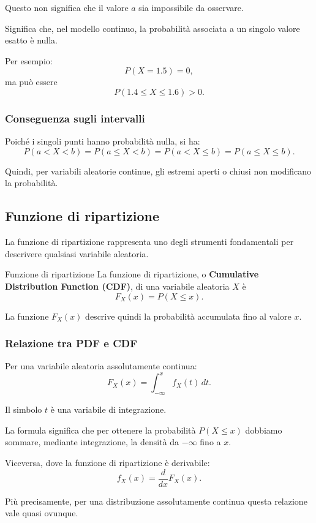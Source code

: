 Questo non significa che il valore $a$
sia impossibile da osservare.

Significa che, nel modello continuo,
la probabilità associata a un singolo
valore esatto è nulla.

Per esempio:
\[
P(X=1.5)=0,
\]
ma può essere
\[
P(1.4\leq X\leq1.6)>0.
\]

\subsubsection{Conseguenza sugli intervalli}

Poiché i singoli punti hanno probabilità
nulla, si ha:
\[
\boxed{
P(a<X<b)
=
P(a\leq X<b)
=
P(a<X\leq b)
=
P(a\leq X\leq b).
}
\]

Quindi, per variabili aleatorie continue,
gli estremi aperti o chiusi
non modificano la probabilità.

\subsection{Funzione di ripartizione}

La funzione di ripartizione rappresenta
uno degli strumenti fondamentali
per descrivere qualsiasi variabile aleatoria.

\begin{definition}{Funzione di ripartizione}
La funzione di ripartizione,
o \textbf{Cumulative Distribution Function (CDF)},
di una variabile aleatoria $X$ è
\[
\boxed{
F_X(x)=P(X\leq x).
}
\]
\end{definition}

La funzione $F_X(x)$ descrive quindi
la probabilità accumulata fino al valore $x$.

\subsubsection{Relazione tra PDF e CDF}

Per una variabile aleatoria
assolutamente continua:
\[
\boxed{
F_X(x)
=
\int_{-\infty}^{x}
f_X(t)\,dt.
}
\]

Il simbolo $t$ è una variabile
di integrazione.

La formula significa che
per ottenere la probabilità
$P(X\leq x)$ dobbiamo sommare,
mediante integrazione,
la densità da $-\infty$ fino a $x$.

Viceversa, dove la funzione
di ripartizione è derivabile:
\[
\boxed{
f_X(x)=\frac{d}{dx}F_X(x).
}
\]

Più precisamente, per una distribuzione
assolutamente continua questa relazione
vale quasi ovunque.

